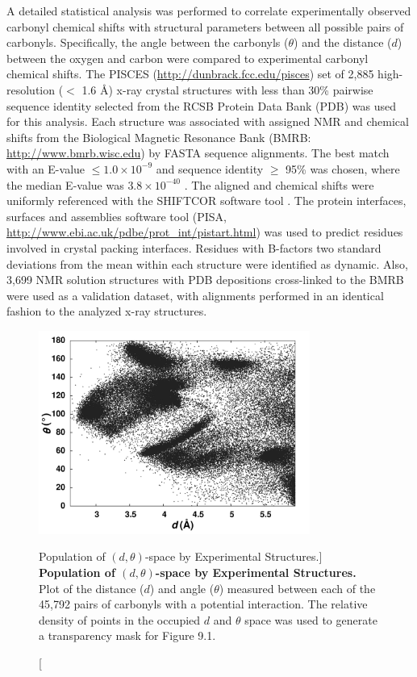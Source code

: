 \begin{doublespace}
A detailed statistical analysis was performed to correlate experimentally
observed carbonyl \cnmr{} chemical shifts with structural parameters between
all possible pairs of carbonyls. Specifically, the angle between the carbonyls
($\theta$) and the distance ($d$) between the oxygen and carbon were compared
to experimental carbonyl \cnmr{} chemical shifts. The PISCES
\cite{wang:binf2003} (\url{http://dunbrack.fcc.edu/pisces}) set of
2,885 high-resolution ($<$ 1.6 \r{A}) x-ray crystal structures with less than
30\% pairwise sequence identity selected from the RCSB Protein Data Bank
(PDB) \cite{berman:nar2000} was used for this analysis. Each structure
was associated with assigned NMR \cnmr{} and \nnmr{} chemical shifts from the
Biological Magnetic Resonance Bank (BMRB: \url{http://www.bmrb.wisc.edu})
\cite{ulrich:nar2008} by FASTA \cite{pearson:mmbio2000}
sequence alignments. The best match with an E-value $\leq 1.0\times10^{-9}$
and sequence identity $\geq$ 95\% was chosen, where the median E-value was
$3.8\times10^{-40}$ . The aligned \cnmr{} and \nnmr{} chemical shifts were
uniformly referenced with the SHIFTCOR software tool
\cite{wishart:jbnmr2003}. The protein interfaces,
surfaces and assemblies software tool
(PISA, \url{http://www.ebi.ac.uk/pdbe/prot_int/pistart.html})
\cite{krissinel:acryst2004} was used to predict residues involved
in crystal packing interfaces. Residues with B-factors two standard deviations
from the mean within each structure were identified as dynamic. Also, 3,699 NMR
solution structures with PDB depositions cross-linked to the BMRB were
used as a validation dataset, with alignments performed in an identical
fashion to the analyzed x-ray structures.
\end{doublespace}

\begin{figure}
\includegraphics[width=3.5in]{figs/npistar/02.png}
\caption
      [Population of $(d,\theta)$-space by Experimental Structures.]{
  {\bf Population of $(d,\theta)$-space by Experimental Structures.}
  \\
  Plot of the distance ($d$) and angle ($\theta$) measured between each of
  the 45,792 pairs of carbonyls with a potential \npistar{} interaction. The
  relative density of points in the occupied $d$ and $\theta$ space was used
  to generate a transparency mask for Figure 9.1.
}
\end{figure}

